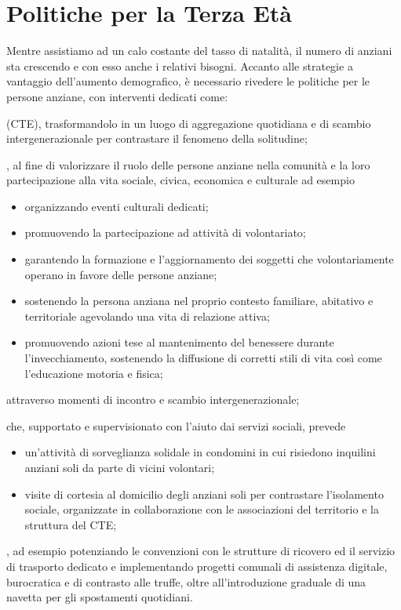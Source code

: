 \section{Politiche per la Terza Età}
Mentre assistiamo ad un calo costante del tasso di natalità, il numero di anziani sta crescendo e con esso anche i relativi bisogni. Accanto alle strategie a vantaggio dell'aumento demografico, è necessario rivedere le politiche per le persone anziane, con interventi dedicati come:

 (CTE), trasformandolo in un luogo di aggregazione quotidiana e di scambio intergenerazionale per contrastare il fenomeno della solitudine;

\begin{bluebox}
, al fine di valorizzare il ruolo delle persone anziane nella comunità e la loro partecipazione alla vita sociale, civica, economica e culturale ad esempio
\begin{itemize}
  \item organizzando eventi culturali dedicati;
  \item promuovendo la partecipazione ad attività di volontariato;
  \item garantendo la formazione e l'aggiornamento dei soggetti che volontariamente operano in favore delle persone anziane; 
  \item sostenendo la persona anziana nel proprio contesto familiare, abitativo e territoriale agevolando una vita di relazione attiva;
  \item promuovendo  azioni tese al mantenimento del benessere durante l'invecchiamento, sostenendo la diffusione di corretti stili di vita così come l'educazione motoria e fisica;
\end{itemize}
\end{bluebox}

attraverso momenti di incontro e scambio intergenerazionale;

 che, supportato e supervisionato con l'aiuto dai servizi sociali, prevede 
\begin{itemize}
  \item un'attività di sorveglianza solidale in condomini in cui risiedono inquilini anziani soli da parte di vicini volontari;  
  \item visite di cortesia al domicilio degli anziani soli per contrastare l'isolamento sociale, organizzate in collaborazione con le associazioni del territorio e la struttura del CTE;
\end{itemize}

, ad esempio potenziando le convenzioni con le strutture di ricovero ed il servizio di trasporto dedicato e implementando progetti comunali di assistenza digitale, burocratica e di contrasto alle truffe, oltre all'introduzione graduale di una navetta per gli spostamenti quotidiani.
